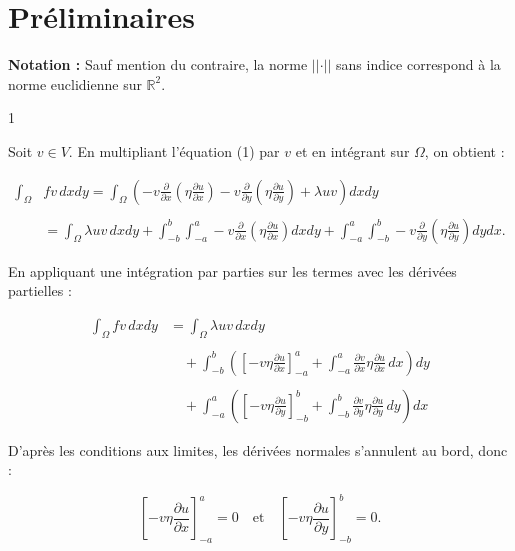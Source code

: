 \section{Préliminaires}

\textbf{Notation :} Sauf mention du contraire, la norme $\vert \vert \cdot \vert \vert$ sans indice correspond à la norme euclidienne sur $\mathbb{R}^2$.


\begin{reponse}{1}

Soit $v \in V$. En multipliant l'équation (1) par $v$ et en intégrant sur $\Omega$, on obtient :

\begin{align*}
    \int_{\Omega} & f v \, dxdy = \int_{\Omega} \left( -v \frac{\partial}{\partial x} \left( \eta \frac{\partial u}{\partial x} \right) - v \frac{\partial}{\partial y} \left( \eta \frac{\partial u}{\partial y} \right) + \lambda u v \right) dxdy \\ \\
    & = \int_{\Omega} \lambda u v \, dxdy + \int_{-b}^{b} \int_{-a}^{a} -v \frac{\partial}{\partial x} \left( \eta \frac{\partial u}{\partial x} \right) dx dy + \int_{-a}^{a} \int_{-b}^{b} -v \frac{\partial}{\partial y} \left( \eta \frac{\partial u}{\partial y} \right) dy dx.
\end{align*}

En appliquant une intégration par parties sur les termes avec les dérivées partielles :

\begin{align*}
    \int_{\Omega} f v \, dxdy &= \int_{\Omega} \lambda u v \, dxdy \\ \\
    &\quad + \int_{-b}^{b} \left( \left[ -v \eta \frac{\partial u}{\partial x} \right]_{-a}^{a} + \int_{-a}^{a} \frac{\partial v}{\partial x} \eta \frac{\partial u}{\partial x} \, dx \right) dy \\ \\
    &\quad + \int_{-a}^{a} \left( \left[ -v \eta \frac{\partial u}{\partial y} \right]_{-b}^{b} + \int_{-b}^{b} \frac{\partial v}{\partial y} \eta \frac{\partial u}{\partial y} \, dy \right) dx
\end{align*}

D'après les conditions aux limites, les dérivées normales s'annulent au bord, donc :

\[
    \left[ -v \eta \frac{\partial u}{\partial x} \right]_{-a}^{a} = 0 \quad \text{et} \quad \left[ -v \eta \frac{\partial u}{\partial y} \right]_{-b}^{b} = 0.
\]


\end{reponse}
